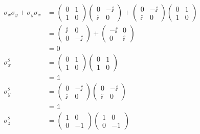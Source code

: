\begin{align*}
    \sigma_x\sigma_y + \sigma_y\sigma_x &= 
    \begin{pmatrix}0 & 1 \\ 1 & 0 \end{pmatrix}\begin{pmatrix} 0 & -\ii \\ \ii & 0 \end{pmatrix} + \begin{pmatrix} 0 & -\ii \\ \ii & 0 \end{pmatrix}\begin{pmatrix}0 & 1 \\ 1 & 0 \end{pmatrix} \\
                     &= \begin{pmatrix} \ii & 0 \\ 0 & - \ii \end{pmatrix} + \begin{pmatrix} -\ii & 0 \\ 0 & \ii \end{pmatrix} \\
                     &= 0 \\
\sigma_x^2 &= \begin{pmatrix}0 & 1 \\ 1 & 0 \end{pmatrix}\begin{pmatrix}0 & 1 \\ 1 & 0 \end{pmatrix} \\
           &= \mathbb{1} \\
    \sigma_y^2 &=  \begin{pmatrix} 0 & -\ii \\ \ii & 0 \end{pmatrix} \begin{pmatrix} 0 & -\ii \\ \ii & 0 \end{pmatrix} \\
               &= \mathbb{1} \\
    \sigma_z^2 &= \begin{pmatrix} 1 & 0 \\ 0 & -1 \end{pmatrix}\begin{pmatrix} 1 & 0 \\ 0 & -1 \end{pmatrix} \\

\end{align*}
